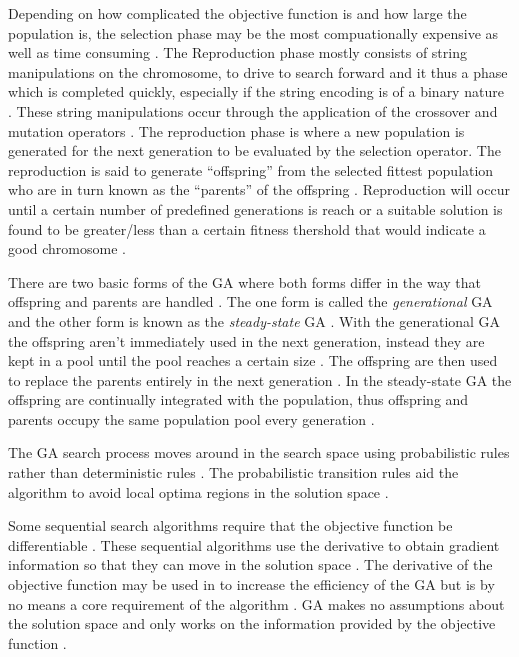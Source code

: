 Depending on how complicated the objective function is and how large the population is, the selection phase may be the most compuationally expensive as well as time consuming \cite{AcceleratingGA}. The Reproduction phase mostly consists of string manipulations on the chromosome, to drive to search forward and it thus a phase which is completed quickly, especially if the string encoding is of a binary nature \cite{AdaptiveSAGA}. These string manipulations occur through the application of the crossover and mutation operators \cite{ConstrainedGA}. The reproduction phase is where a new population is generated for the next generation to be evaluated by the selection operator. The reproduction is said to generate ``offspring'' from the selected fittest population who are in turn known as the ``parents'' of the offspring \cite{HumanPassiveGA,ConstrainedGA}. Reproduction will occur until a certain number of predefined generations is reach or a suitable solution is found to be greater/less than a certain fitness thershold that would indicate a good chromosome \cite{GATSP}.

There are two basic forms of the GA where both forms differ in the way that offspring and parents are handled \cite{FamilyGA}. The one form is called the \emph{generational} GA  and the other form is known as the \emph{steady-state} GA \cite{GeostatisticalGA,FamilyGA}. With the generational GA the offspring aren't immediately used in the next generation, instead they are kept in a pool until the pool reaches a certain size \cite{FamilyGA}. The offspring are then used to replace the parents entirely in the next generation \cite{FamilyGA}. In the steady-state GA the offspring are continually integrated with the population, thus offspring and parents occupy the same population pool every generation \cite{GeostatisticalGA,FamilyGA}.

The GA search process moves around in the search space using probabilistic rules rather than deterministic rules \cite{FamilyGA}. The probabilistic transition rules aid the algorithm to avoid local optima regions in the solution space \cite{HybridIntelliGA}. 

Some sequential search algorithms require that the objective function be differentiable \cite{ConstrainedGA}. These sequential algorithms use the derivative to obtain gradient information so that they can move in the solution space \cite{ConstrainedGA}. The derivative of the objective function may be used in to increase the efficiency of the GA but is by no means a core requirement of the algorithm \cite{ConstrainedGA,HybridIntelliGA}. GA makes no assumptions about the solution space and only works on the information provided by the objective function \cite{ConstrainedGA,HybridIntelliGA}. 


